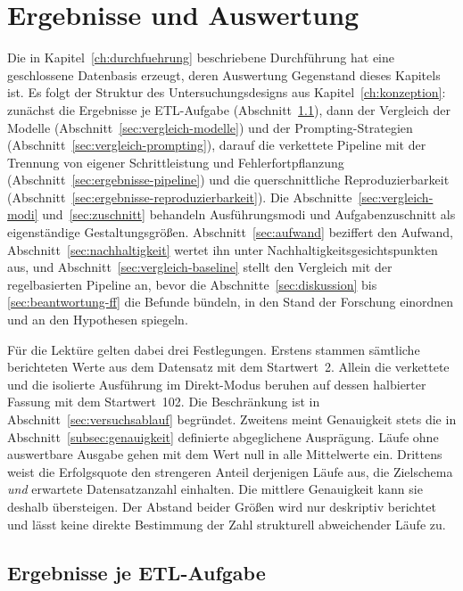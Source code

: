 
\chapter{Ergebnisse und Auswertung}
\label{ch:ergebnisse}

Die in Kapitel~\ref{ch:durchfuehrung} beschriebene Durchführung hat eine geschlossene Datenbasis erzeugt, deren Auswertung Gegenstand dieses Kapitels ist. Es folgt der Struktur des Untersuchungsdesigns aus Kapitel~\ref{ch:konzeption}: zunächst die Ergebnisse je \ac{ETL}-Aufgabe (Abschnitt~\ref{sec:ergebnisse-aufgaben}), dann der Vergleich der Modelle (Abschnitt~\ref{sec:vergleich-modelle}) und der Prompting-Strategien (Abschnitt~\ref{sec:vergleich-prompting}), darauf die verkettete Pipeline mit der Trennung von eigener Schrittleistung und Fehlerfortpflanzung (Abschnitt~\ref{sec:ergebnisse-pipeline}) und die querschnittliche Reproduzierbarkeit (Abschnitt~\ref{sec:ergebnisse-reproduzierbarkeit}). Die Abschnitte~\ref{sec:vergleich-modi} und~\ref{sec:zuschnitt} behandeln Ausführungsmodi und Aufgabenzuschnitt als eigenständige Gestaltungsgrößen. Abschnitt~\ref{sec:aufwand} beziffert den Aufwand, Abschnitt~\ref{sec:nachhaltigkeit} wertet ihn unter Nachhaltigkeitsgesichtspunkten aus, und Abschnitt~\ref{sec:vergleich-baseline} stellt den Vergleich mit der regelbasierten Pipeline an, bevor die Abschnitte~\ref{sec:diskussion} bis \ref{sec:beantwortung-ff} die Befunde bündeln, in den Stand der Forschung einordnen und an den Hypothesen spiegeln.

Für die Lektüre gelten dabei drei Festlegungen. Erstens stammen sämtliche berichteten Werte aus dem Datensatz mit dem Startwert~2. Allein die verkettete und die isolierte Ausführung im Direkt-Modus beruhen auf dessen halbierter Fassung mit dem Startwert~102. Die Beschränkung ist in Abschnitt~\ref{sec:versuchsablauf} begründet. Zweitens meint Genauigkeit stets die in Abschnitt~\ref{subsec:genauigkeit} definierte abgeglichene Ausprägung. Läufe ohne auswertbare Ausgabe gehen mit dem Wert null in alle Mittelwerte ein. Drittens weist die Erfolgsquote den strengeren Anteil derjenigen Läufe aus, die Zielschema \emph{und} erwartete Datensatzanzahl einhalten. Die mittlere Genauigkeit kann sie deshalb übersteigen. Der Abstand beider Größen wird nur deskriptiv berichtet und lässt keine direkte Bestimmung der Zahl strukturell abweichender Läufe zu.

\section{Ergebnisse je ETL-Aufgabe}
\label{sec:ergebnisse-aufgaben}

